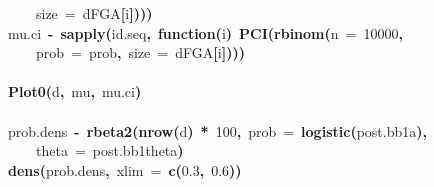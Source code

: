 \documentclass{article}
\makeatletter
\newcommand{\hlnumber}[1]{\textcolor[rgb]{0,0,0}{#1}}%
\newcommand{\hlfunctioncall}[1]{\textcolor[rgb]{.5,0,.33}{\textbf{#1}}}%
\newcommand{\hlkeyword}[1]{\textbf{#1}}%
\newcommand{\hlargument}[1]{\textcolor[rgb]{.69,.25,.02}{#1}}%
\newcommand{\hlformalargs}[1]{\hlargument{#1}}%
\newcommand{\hlassignement}[1]{\textbf{#1}}%
\newcommand{\hlsymbol}[1]{#1}%
\newcommand{\hlstd}[1]{\textcolor[rgb]{0,0,0}{#1}}%
\newenvironment{kframe}{%
 \def\FrameCommand##1{\hskip\@totalleftmargin \hskip-\fboxsep
 \colorbox{shadecolor}{##1}\hskip-\fboxsep
     \hskip-\linewidth \hskip-\@totalleftmargin \hskip\columnwidth}%
 \MakeFramed {\advance\hsize-\width
   \@totalleftmargin\z@ \linewidth\hsize
   \@setminipage}}%
 {\par\unskip\endMakeFramed}
\newenvironment{knitrout}{}{} %
\makeatother
\begin{document}
\begin{knitrout}
{\begin{kframe}
\begin{flushleft}
\hlstd{}{\ }{\ }{\ }{\ }\hlargument{size}{\ }\hlargument{=}{\ }\hlsymbol{d}\hlkeyword{\usebox{\hlnormalsizeboxdollar}}\hlsymbol{FGA}\hlkeyword{[}\hlsymbol{i}\hlkeyword{]}\hlkeyword{)}\hlkeyword{)}\hlkeyword{)}\hspace*{\fill}\\
\hlstd{}\hlsymbol{mu.ci}{\ }\hlassignement{\usebox{\hlnormalsizeboxlessthan}-}{\ }\hlfunctioncall{sapply}\hlkeyword{(}\hlsymbol{id.seq}\hlkeyword{,}{\ }\hlkeyword{function}\hlkeyword{(}\hlformalargs{i}\hlkeyword{)}{\ }\hlfunctioncall{PCI}\hlkeyword{(}\hlfunctioncall{rbinom}\hlkeyword{(}\hlargument{n}{\ }\hlargument{=}{\ }\hlnumber{10000}\hlkeyword{,}\hspace*{\fill}\\
\hlstd{}{\ }{\ }{\ }{\ }\hlargument{prob}{\ }\hlargument{=}{\ }\hlsymbol{prob}\hlkeyword{,}{\ }\hlargument{size}{\ }\hlargument{=}{\ }\hlsymbol{d}\hlkeyword{\usebox{\hlnormalsizeboxdollar}}\hlsymbol{FGA}\hlkeyword{[}\hlsymbol{i}\hlkeyword{]}\hlkeyword{)}\hlkeyword{)}\hlkeyword{)}\hspace*{\fill}\\
\hlstd{}\hspace*{\fill}\\
\hlstd{}\hlfunctioncall{Plot0}\hlkeyword{(}\hlsymbol{d}\hlkeyword{,}{\ }\hlsymbol{mu}\hlkeyword{,}{\ }\hlsymbol{mu.ci}\hlkeyword{)}\hspace*{\fill}\\
\hlstd{}\hspace*{\fill}\\
\hlstd{}\hlsymbol{prob.dens}{\ }\hlassignement{\usebox{\hlnormalsizeboxlessthan}-}{\ }\hlfunctioncall{rbeta2}\hlkeyword{(}\hlfunctioncall{nrow}\hlkeyword{(}\hlsymbol{d}\hlkeyword{)}{\ }\hlkeyword{*}{\ }\hlnumber{100}\hlkeyword{,}{\ }\hlargument{prob}{\ }\hlargument{=}{\ }\hlfunctioncall{logistic}\hlkeyword{(}\hlsymbol{post.bb1}\hlkeyword{\usebox{\hlnormalsizeboxdollar}}\hlsymbol{a}\hlkeyword{)}\hlkeyword{,}\hspace*{\fill}\\
\hlstd{}{\ }{\ }{\ }{\ }\hlargument{theta}{\ }\hlargument{=}{\ }\hlsymbol{post.bb1}\hlkeyword{\usebox{\hlnormalsizeboxdollar}}\hlsymbol{theta}\hlkeyword{)}\hspace*{\fill}\\
\hlstd{}\hlfunctioncall{dens}\hlkeyword{(}\hlsymbol{prob.dens}\hlkeyword{,}{\ }\hlargument{xlim}{\ }\hlargument{=}{\ }\hlfunctioncall{c}\hlkeyword{(}\hlnumber{0.3}\hlkeyword{,}{\ }\hlnumber{0.6}\hlkeyword{)}\hlkeyword{)}\hspace*{\fill}\\

\end{flushleft}
\end{kframe}}
\end{knitrout}
\end{document}
